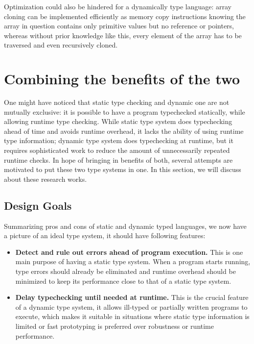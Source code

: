 Optimization could also be hindered for a dynamically type language: 
array cloning can be implemented efficiently as memory copy instructions knowing the array in question contains only primitive values but no reference or pointers, whereas without prior knowledge like this, every element of the array has to be traversed and even recursively cloned.


\section{Combining the benefits of the two}


One might have noticed that static type checking and dynamic one
are not mutually exclusive: it is possible to have a program typechecked
statically, while allowing runtime type checking.
While static type system does typechecking ahead of time
and avoids runtime overhead,
it lacks the ability of using runtime type information;
dynamic type system does typechecking at runtime,
but it requires sophisticated work to reduce the amount of
unnecessarily repeated runtime checks.
In hope of bringing in benefits of both,
several attempts are motivated to put these two type systems in one.
In this section, we will discuss about these research works.

\subsection{Design Goals}


Summarizing pros and cons of static and dynamic typed languages,
we now have a picture of an ideal type system, it should have following features:

\begin{itemize}
	\item \textbf{Detect and rule out errors ahead of program execution.} This is one main purpose of having a static type system. When a program starts running,
	type errors should already be eliminated and runtime overhead should be minimized
	to keep its performance close to that of a static type system.
	\item \textbf{Delay typechecking until needed at runtime.}
	This is the crucial feature of a dynamic type system,
	it allows ill-typed or partially written programs to execute,
	which makes it suitable in situations where static type information
	is limited or fast prototyping is preferred over robustness or runtime performance.
\end{itemize}

